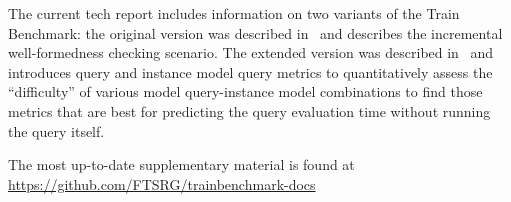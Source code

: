 \documentclass[12pt,twoside,a4paper]{report}
\begin{document}
The current tech report includes information on two variants of the Train Benchmark: the original version was described in~\cite{SCP2014} and describes the incremental well-formedness checking scenario. The extended version was described in~\cite{ASE2013} and introduces query and instance model query metrics to quantitatively assess the ``difficulty'' of various model query-instance model combinations to find those metrics that are best for predicting the query evaluation time without running the query itself.

The most up-to-date supplementary material is found at \url{https://github.com/FTSRG/trainbenchmark-docs}












\clearpage



\end{document}
